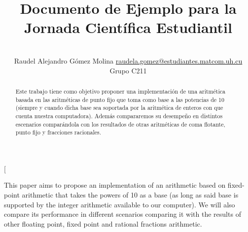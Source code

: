 \documentclass[a4paper,10pt,twocolumn]{article}
\title{Documento de Ejemplo para la Jornada Científica Estudiantil}
\author{\\
\name Raudel Alejandro Gómez Molina \email \href{mailto:raudela.gomez@estudiantes.matcom.uh.cu}{raudela.gomez@estudiantes.matcom.uh.cu}
	\\ \addr Grupo C211}
\begin{document}
\twocolumn[

\maketitle


\begin{abstract}

	Este trabajo tiene como objetivo proponer una implementación de una aritmética basada en las aritméticas de punto fijo que toma como base a las potencias de 10 (siempre y cuando dicha base sea soportada por la aritmética de enteros con que cuenta nuestra computadora). Además compararemos su desempeño en distintos escenarios comparándola con los resultados de otras aritméticas de coma flotante, punto fijo y fracciones racionales.
	
\end{abstract}

\vspace{0.5cm}

\begin{enabstract}

	This paper aims to propose an implementation of an arithmetic based on fixed-point arithmetic that takes the powers of 10 as a base (as long as said base is supported by the integer arithmetic available to our computer). We will also compare its performance in different scenarios comparing it with the results of other floating point, fixed point and rational fractions arithmetic.

\end{enabstract}
\end{document}
